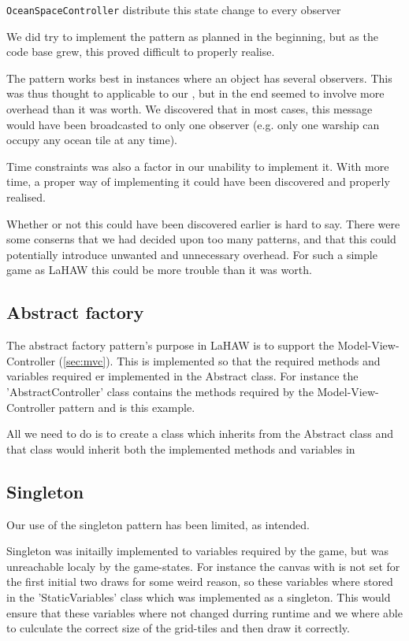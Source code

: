 \texttt{OceanSpaceController} distribute this state change to every observer

We did try to implement the pattern as planned in the beginning, but as the code base grew, this proved difficult to properly realise.

The pattern works best in instances where an object has several observers. This was thus thought to applicable to our 
, but in the end seemed to involve more overhead than it was worth. We discovered that in most cases, this message would have been broadcasted to only one observer (e.g. only one warship can occupy any ocean tile at any time).

Time constraints was also a factor in our unability to implement it. With more time, a proper way of implementing it could have been discovered and properly realised.

Whether or not this could have been discovered earlier is hard to say. There were some conserns that we had decided upon too many patterns, and that this could potentially introduce unwanted and unnecessary overhead. For such a simple game as LaHAW this could be more trouble than it was worth.



\subsection{Abstract factory}
\label{sec:absfac}
The abstract factory pattern's purpose in LaHAW is to support the Model-View-Controller (\ref{sec:mvc}). This is implemented so that the required methods and variables required er implemented in the Abstract class. For instance the 'AbstractController' class contains the methods required by the Model-View-Controller pattern and is this example.

All we need to do is to create a class which inherits from the Abstract class and that class would inherit both the implemented methods and variables in 

\subsection{Singleton}
Our use of the singleton pattern has been limited, as intended.

Singleton was initailly implemented to variables required by the game, but was unreachable localy by the game-states.
For instance the canvas with is not set for the first initial two draws for some weird reason, so these variables where stored in the 'StaticVariables' class which was implemented as a singleton. This would ensure that these variables where not changed durring runtime and we where able to culculate the correct size of the grid-tiles and then draw it correctly.


